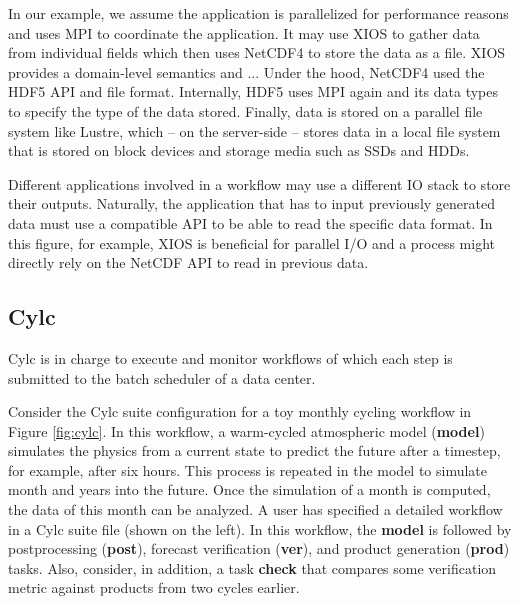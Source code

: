 \documentclass[a4paper]{article}
\newcommand{\jk}[1]{\todo[inline]{JK: #1}}
\begin{document}
{{\qquad
\begin{minipage}{0.7\textwidth}
In our example, we assume the application is parallelized for performance reasons and uses MPI to coordinate the application.
It may use XIOS to gather data from individual fields which then uses NetCDF4 to store the data as a file.
XIOS provides a domain-level semantics and ...\jk{TODO}
Under the hood, NetCDF4 used the HDF5 API and file format.
Internally, HDF5 uses MPI again and its data types to specify the type of the data stored.
Finally, data is stored on a parallel file system like Lustre, which -- on the server-side -- stores data in a local file system that is stored on block devices and storage media such as SSDs and HDDs.

Different applications involved in a workflow may use a different IO stack to store their outputs.
Naturally, the application that has to input previously generated data must use a compatible API to be able to read the specific data format.
In this figure, for example, XIOS is beneficial for parallel I/O and a process might directly rely on the NetCDF API to read in previous data.
\end{minipage}


\subsection{Cylc}

Cylc is in charge to execute and monitor workflows of which each step is submitted to the batch scheduler of a data center.



Consider the Cylc suite configuration for a toy monthly cycling workflow in Figure \ref{fig:cylc}.
In this workflow, a warm-cycled atmospheric model (\textbf{model}) simulates the physics from a current state to predict the future after a timestep, for example, after six hours.
This process is repeated in the model to simulate month and years into the future.
Once the simulation of a month is computed, the data of this month can be analyzed.
A user has specified a detailed workflow in a Cylc suite file (shown on the left).
In this workflow, the \textbf{model} is followed by postprocessing (\textbf{post}), forecast verification (\textbf{ver}), and product generation (\textbf{prod}) tasks.
Also, consider, in addition, a task \textbf{check} that compares some verification metric against products from two cycles earlier.

}}
\end{document}
